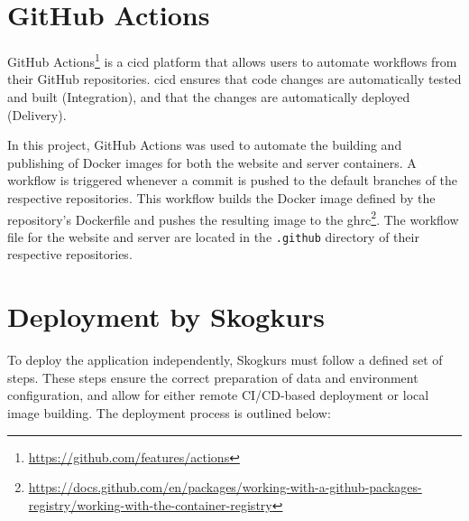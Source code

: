\section{GitHub Actions}

GitHub Actions\footnote{\url{https://github.com/features/actions}} is a \acrfull{cicd} platform that allows users to automate workflows from their GitHub repositories. \acrshort{cicd} ensures that code changes are automatically tested and built (Integration), and that the changes are automatically deployed (Delivery).

In this project, GitHub Actions was used to automate the building and publishing of Docker images for both the website and server containers. A workflow is triggered whenever a commit is pushed to the default branches of the respective repositories. This workflow builds the Docker image defined by the repository's Dockerfile and pushes the resulting image to the \acrfull{ghrc}\footnote{\url{https://docs.github.com/en/packages/working-with-a-github-packages-registry/working-with-the-container-registry}}. The workflow file for the website and server are located in the \texttt{.github} directory of their respective repositories.

\section{Deployment by Skogkurs}

To deploy the application independently, Skogkurs must follow a defined set of steps. These steps ensure the correct preparation of data and environment configuration, and allow for either remote CI/CD-based deployment or local image building. The deployment process is outlined below:

